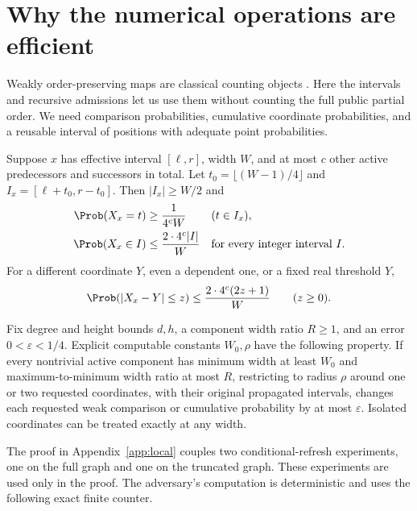 \section{Why the numerical operations are efficient}
\label{sec:local}

Weakly order-preserving maps are classical counting objects
\citep{Stanley1986}. Here the intervals and recursive admissions let us use
them without counting the full public partial order.
We need comparison probabilities, cumulative coordinate probabilities, and
a reusable interval of positions with adequate point probabilities.

\begin{lemma}
\label{lem:insertion}
Suppose $x$ has effective interval $[\ell,r]$, width $W$, and at most $c$
other active predecessors and successors in total. Let
$t_0=\lfloor(W-1)/4\rfloor$ and $I_x=[\ell+t_0,r-t_0]$. Then
$|I_x|\geq W/2$ and
\begin{align}
\Prob(X_x=t)&\geq \frac{1}{4^cW} &&(t\in I_x),\label{eq:central}\\
\Prob(X_x\in I)&\leq\frac{2\cdot4^c|I|}{W}
 &&\text{for every integer interval }I.\label{eq:concentration}
\end{align}
For a different coordinate $Y$, even a dependent one, or a fixed real
threshold $Y$,
\begin{equation}
\Prob(|X_x-Y|\leq z)\leq \frac{2\cdot4^c(2z+1)}{W}
\qquad(z\geq0).
\label{eq:near-tie}
\end{equation}
\end{lemma}

\begin{lemma}
\label{lem:local}
Fix degree and height bounds $d,h$, a component width ratio $R\geq1$,
and an error $0<\varepsilon<1/4$. Explicit computable constants
$W_0,\rho$ have the following property. If every nontrivial active
component has minimum width at least $W_0$ and maximum-to-minimum width
ratio at most $R$, restricting to radius $\rho$ around one or two requested
coordinates, with their original propagated intervals, changes each requested
weak comparison or cumulative probability by at most $\varepsilon$.
Isolated coordinates can be treated exactly at any width.
\end{lemma}

The proof in Appendix~\ref{app:local} couples two conditional-refresh
experiments, one on the full graph and one on the truncated graph.
These experiments are used only in the proof. The adversary's computation
is deterministic and uses the following exact finite counter.

